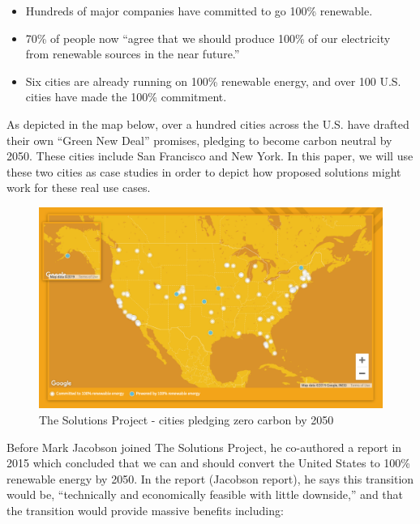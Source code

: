 \documentclass[hidelinks,12pt,a4paper]{article}
\begin{document}
{\footnotesize
\begin{itemize}
    \item Hundreds of major companies have committed to go 100\% renewable.
    \item 70\% of people now “agree that we should produce 100\% of our electricity from renewable sources in the near future.”
    \item Six cities are already running on 100\% renewable energy, and over 100 U.S. cities have made the 100\% commitment.
\end{itemize}
}

As depicted in the map below, over a hundred cities across the U.S. have drafted their own “Green New Deal” promises, pledging to become carbon neutral by 2050. These cities include San Francisco \cite{SFNetZeroBy2050} and New York. \cite{ActionOnGlobalWarmingNYCsGreenNewDeal} In this paper, we will use these two cities as case studies in order to depict how proposed solutions might work for these real use cases.

\begin{figure}[ht!]
    \centering
    \includegraphics[width=1\textwidth]{over-100-cities-go-100-green.png}
    \caption{The Solutions Project - cities pledging zero carbon by 2050 \cite{TheSolutionsProject2018ImpactReport}}
\end{figure}
\FloatBarrier


Before Mark Jacobson joined The Solutions Project, he co-authored a report in 2015 which concluded that we can and should convert the United States to 100\% renewable energy by 2050. In the report (Jacobson report), he says this transition would be, “technically and economically feasible with little downside,” \cite{100PercCleanAndRenewableEnergyBy2050} and that the transition would provide massive benefits including: \cite{100PercCleanAndRenewableEnergyBy2050}
\end{document}
